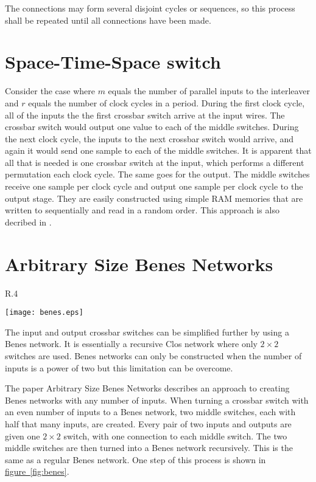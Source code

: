 \documentclass[
	utf8,
	largesmallcaps,
	intlimits,
	widermath,
	sharecounter,
	nobreak,
	definition=marks,
	numbers,
	noparts
]{rtthesis}
\newcommand{\figureref}[1]{\hyperref[#1]{figure~\ref*{#1}}}
\begin{document}
The connections may form several disjoint cycles or sequences, so this process
shall be repeated until all connections have been made.

\section{Space-Time-Space switch}

Consider the case where $m$ equals the number of parallel inputs to the
interleaver and $r$ equals the number of clock cycles in a period. During the
first clock cycle, all of the inputs the the first crossbar switch arrive at
the input wires. The crossbar switch would output one value to each of the
middle switches. During the next clock cycle, the inputs to the next crossbar
switch would arrive, and again it would send one sample to each of the middle
switches. It is apparent that all that is needed is one crossbar switch at the
input, which performs a different permutation each clock cycle. The same goes
for the output. The middle switches receive one sample per clock cycle and
output one sample per clock cycle to the output stage. They are easily
constructed using simple RAM memories that are written to sequentially and read
in a random order. This approach is also decribed in
\cite{DBLP:conf/icassp/PrescherGN05}.

\section{Arbitrary Size Benes Networks}

\begin{wrapfigure}{R}{.4\textwidth}
\begin{center}
\texttt{[image: benes.eps]}
\end{center}
\caption{
How a Benes network is constructed.
}
\label{fig:benes}
\end{wrapfigure}

The input and output crossbar switches can be simplified further by using a
Benes network. It is essentially a recursive Clos network where only $2 \times
2$ switches are used. Benes networks can only be constructed when the number of
inputs is a power of two but this limitation can be overcome.

The paper Arbitrary Size Benes Networks\cite{Chang97arbitrarysize} describes
an approach to creating Benes networks with any number of inputs. When turning
a crossbar switch with an even number of inputs to a Benes network, two middle
switches, each with half that many inputs, are created. Every pair of two
inputs and outputs are given one $2 \times 2$ switch, with one connection to
each middle switch. The two middle switches are then turned into a Benes
network recursively. This is the same as a regular Benes network. One step of
this process is shown in \figureref{fig:benes}.
\end{document}
